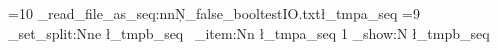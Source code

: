 \documentclass{article}
\begin{document}
\ExplSyntaxOn




=10%
\ztool_read_file_as_seq:nnN{\c_false_bool}{testIO.txt}\l_tmpa_seq%
=9
\seq_set_split:Nne \l_tmpb_seq 
  {~}{\seq_item:Nn \l_tmpa_seq {1}}
\seq_show:N \l_tmpb_seq %


\ExplSyntaxOff
\end{document}
